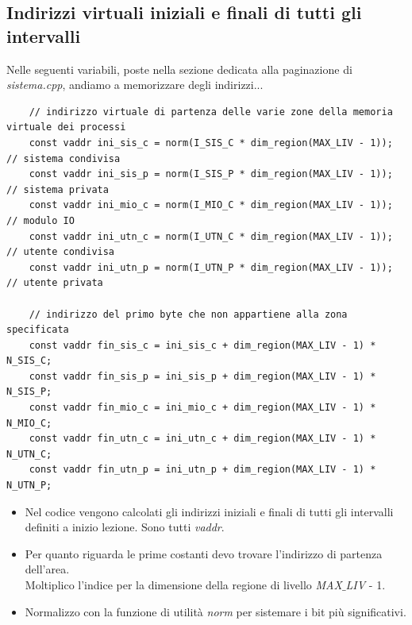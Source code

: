\documentclass[11pt]{report}
\theoremstyle{definition}
\begin{document}
\subsection{Indirizzi virtuali iniziali e finali di tutti gli intervalli}
Nelle seguenti variabili, poste nella sezione dedicata alla paginazione di \emph{sistema.cpp}, andiamo a memorizzare degli indirizzi...
\small 
\begin{verbatim}
	// indirizzo virtuale di partenza delle varie zone della memoria virtuale dei processi
	const vaddr ini_sis_c = norm(I_SIS_C * dim_region(MAX_LIV - 1)); // sistema condivisa
	const vaddr ini_sis_p = norm(I_SIS_P * dim_region(MAX_LIV - 1)); // sistema privata
	const vaddr ini_mio_c = norm(I_MIO_C * dim_region(MAX_LIV - 1)); // modulo IO
	const vaddr ini_utn_c = norm(I_UTN_C * dim_region(MAX_LIV - 1)); // utente condivisa
	const vaddr ini_utn_p = norm(I_UTN_P * dim_region(MAX_LIV - 1)); // utente privata
	
	// indirizzo del primo byte che non appartiene alla zona specificata
	const vaddr fin_sis_c = ini_sis_c + dim_region(MAX_LIV - 1) * N_SIS_C;
	const vaddr fin_sis_p = ini_sis_p + dim_region(MAX_LIV - 1) * N_SIS_P;
	const vaddr fin_mio_c = ini_mio_c + dim_region(MAX_LIV - 1) * N_MIO_C;
	const vaddr fin_utn_c = ini_utn_c + dim_region(MAX_LIV - 1) * N_UTN_C;
	const vaddr fin_utn_p = ini_utn_p + dim_region(MAX_LIV - 1) * N_UTN_P;
\end{verbatim}
\normalsize 
\begin{itemize}
	\item Nel codice vengono calcolati gli indirizzi iniziali e finali di tutti gli intervalli definiti a inizio lezione. Sono tutti \emph{vaddr}.
	\item Per quanto riguarda le prime costanti devo trovare l'indirizzo di partenza dell'area.\\Moltiplico l'indice per la dimensione della regione di livello \emph{MAX$\_$LIV} - 1.
	\item Normalizzo con la funzione di utilità \emph{norm} per sistemare i bit più significativi.
\end{itemize}
\end{document}
